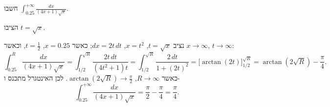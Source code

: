 
\begin{question}
חשבו $\displaystyle\int_{0.25}^{+\infty}\frac{dx}{(4x+1)\sqrt x}$.
\end{question}

\begin{hint}
הציבו $t=\sqrt x$.
\end{hint}

\begin{solution}
נציב $t=\sqrt x$, $x=t^2$, $dx=2t\,dt$; כאשר $x=0.25$, $t=\frac12$, וכאשר $x\to\infty$, $t\to\infty$:
\[ \int_{0.25}^{R}\frac{dx}{(4x+1)\sqrt x}=\int_{1/2}^{\sqrt R}\frac{2t\,dt}{(4t^2+1)t}=\int_{1/2}^{\sqrt R}\frac{2\,dt}{1+(2t)^2}=\Big[\arctan(2t)\Big]_{1/2}^{\sqrt R}=\arctan(2\sqrt R)-\frac\pi4. \]
כאשר $R\to\infty$, $\arctan(2\sqrt R)\to\frac\pi2$. לכן האינטגרל מתכנס ו-
\[ \int_{0.25}^{+\infty}\frac{dx}{(4x+1)\sqrt x}=\frac\pi2-\frac\pi4=\frac\pi4. \]
\end{solution}
